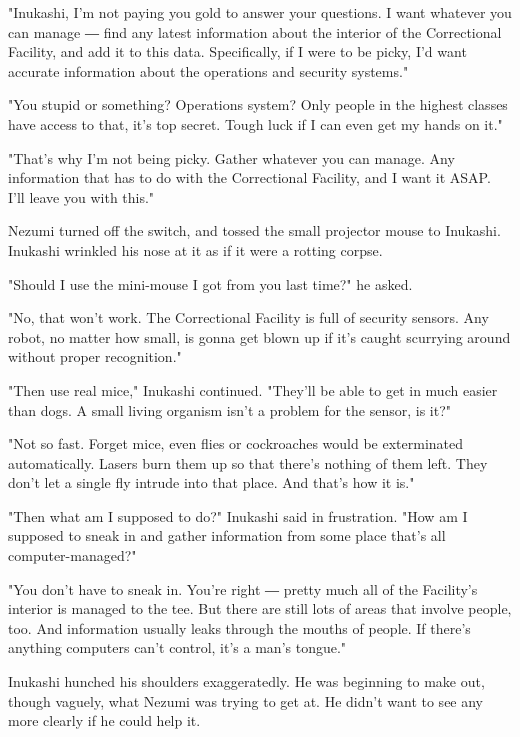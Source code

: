 "Inukashi, I'm not paying you gold to answer your questions. I want
whatever you can manage ― find any latest information about the interior
of the Correctional Facility, and add it to this data. Specifically, if
I were to be picky, I'd want accurate information about the operations
and security systems."

"You stupid or something? Operations system? Only people in the highest
classes have access to that, it's top secret. Tough luck if I can even
get my hands on it."

"That's why I'm not being picky. Gather whatever you can manage. Any
information that has to do with the Correctional Facility, and I want it
ASAP. I'll leave you with this."

Nezumi turned off the switch, and tossed the small projector mouse to
Inukashi. Inukashi wrinkled his nose at it as if it were a rotting
corpse.

"Should I use the mini-mouse I got from you last time?" he asked.

"No, that won't work. The Correctional Facility is full of security
sensors. Any robot, no matter how small, is gonna get blown up if it's
caught scurrying around without proper recognition."

"Then use real mice," Inukashi continued. "They'll be able to get in
much easier than dogs. A small living organism isn't a problem for the
sensor, is it?"

"Not so fast. Forget mice, even flies or cockroaches would be
exterminated automatically. Lasers burn them up so that there's nothing
of them left. They don't let a single fly intrude into that place. And
that's how it is."

"Then what am I supposed to do?" Inukashi said in frustration. "How am I
supposed to sneak in and gather information from some place that's all
computer-managed?"

"You don't have to sneak in. You're right ― pretty much all of the
Facility's interior is managed to the tee. But there are still lots of
areas that involve people, too. And information usually leaks through
the mouths of people. If there's anything computers can't control, it's
a man's tongue."

Inukashi hunched his shoulders exaggeratedly. He was beginning to make
out, though vaguely, what Nezumi was trying to get at. He didn't want to
see any more clearly if he could help it.

